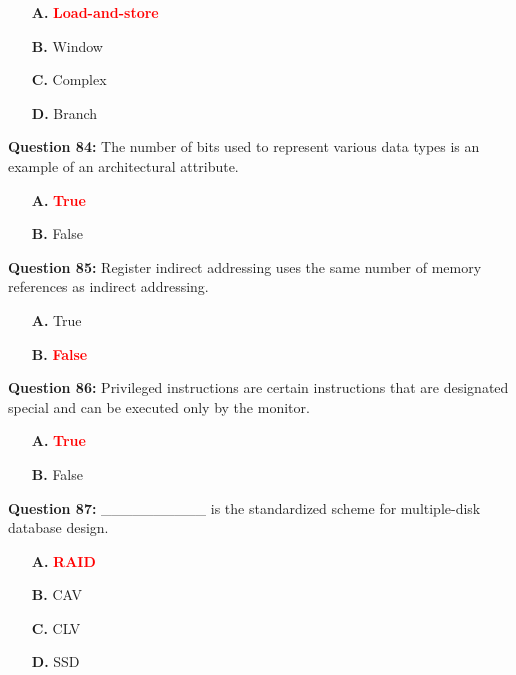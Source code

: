 \documentclass[12pt,a4paper]{article}
\begin{document}
\begin{itemize}
    \item[\textbf{A.}] \textcolor{red}{\textbf{Load-and-store}}
    \item[\textbf{B.}] Window
    \item[\textbf{C.}] Complex
    \item[\textbf{D.}] Branch
\end{itemize}

\vspace{0.5cm}

\textbf{Question 84:} The number of bits used to represent various data types is an example of an architectural attribute.

\begin{itemize}
    \item[\textbf{A.}] \textcolor{red}{\textbf{True}}
    \item[\textbf{B.}] False
\end{itemize}

\vspace{0.5cm}

\textbf{Question 85:} Register indirect addressing uses the same number of memory references as indirect addressing.

\begin{itemize}
    \item[\textbf{A.}] True
    \item[\textbf{B.}] \textcolor{red}{\textbf{False}}
\end{itemize}

\vspace{0.5cm}

\textbf{Question 86:} Privileged instructions are certain instructions that are designated special and can be executed only by the monitor.

\begin{itemize}
    \item[\textbf{A.}] \textcolor{red}{\textbf{True}}
    \item[\textbf{B.}] False
\end{itemize}

\vspace{0.5cm}

\textbf{Question 87:} __________ is the standardized scheme for multiple-disk database design.

\begin{itemize}
    \item[\textbf{A.}] \textcolor{red}{\textbf{RAID}}
    \item[\textbf{B.}] CAV
    \item[\textbf{C.}] CLV
    \item[\textbf{D.}] SSD
\end{itemize}
\end{document}
